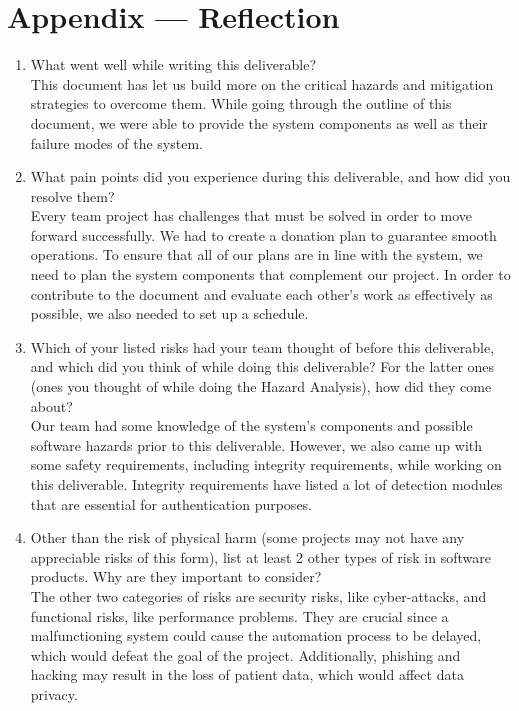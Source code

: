 \documentclass{article}
\begin{document}
\section*{Appendix --- Reflection}




\begin{enumerate}
    \item What went well while writing this deliverable?\\
    This document has let us build more on the critical hazards and mitigation strategies to overcome them. While going through the outline of this document, we were able to provide the system components as well as their failure modes of the system. 
    
    \item What pain points did you experience during this deliverable, and how did you resolve them?\\
    Every team project has challenges that must be solved in order to move forward successfully. We had to create a donation plan to guarantee smooth operations. To ensure that all of our plans are in line with the system, we need to plan the system components that complement our project. In order to contribute to the document and evaluate each other's work as effectively as possible, we also needed to set up a schedule.

    \item Which of your listed risks had your team thought of before this deliverable, and which did you think of while doing this deliverable? For the latter ones (ones you thought of while doing the Hazard Analysis), how did they come about?\\
    Our team had some knowledge of the system's components and possible software hazards prior to this deliverable. However, we also came up with some safety requirements, including integrity requirements, while working on this deliverable. Integrity requirements have listed a lot of detection modules that are essential for authentication purposes.
    
    \item Other than the risk of physical harm (some projects may not have any appreciable risks of this form), list at least 2 other types of risk in software products. Why are they important to consider?\\
    The other two categories of risks are security risks, like cyber-attacks, and functional risks, like performance problems. They are crucial since a malfunctioning system could cause the automation process to be delayed, which would defeat the goal of the project. Additionally, phishing and hacking may result in the loss of patient data, which would affect data privacy. 

\end{enumerate}
\end{document}
